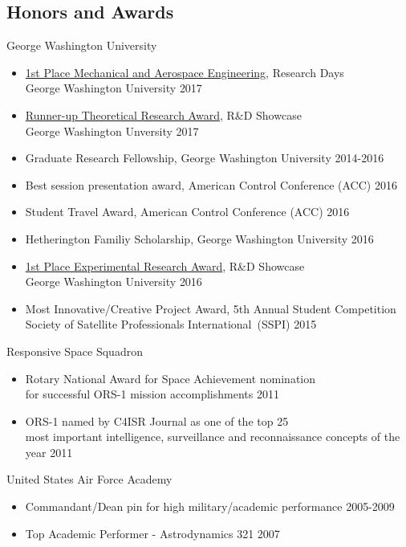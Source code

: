 \subsection*{Honors and Awards} %
{}

George Washington University
\begin{itemize}
    \item {\href{http://researchdays.gwu.edu}{1st Place Mechanical and Aerospace Engineering}, Research Days\\George Washington University} \hfill {2017} 
    \item {\href{https://www.seas.gwu.edu/RDshowcase}{Runner-up Theoretical Research Award}, R\&D Showcase\\George Washington Unversity} \hfill {2017}
    \item Graduate Research Fellowship, George Washington University \hfill {2014-2016}
    \item Best session presentation award, American Control Conference (ACC) \hfill {2016}
    \item Student Travel Award, American Control Conference (ACC) \hfill {2016}
    \item Hetherington Familiy Scholarship, George Washington University \hfill {2016}
    \item {\href{1https://www.seas.gwu.edu/student-research-development-winners-year#2016}{1st Place Experimental Research Award}, R\&D Showcase\\ George Washington University} \hfill {2016}
    \item {Most Innovative/Creative Project Award, 5th Annual Student Competition \\ 
    Society of Satellite Professionals International~(SSPI) } \hfill {2015}  
\end{itemize}

Responsive Space Squadron
\begin{itemize}
    \item Rotary National Award for Space Achievement nomination \\
    for successful ORS-1 mission accomplishments \hfill {2011} 
    \item ORS-1 named by C4ISR Journal as one of the top 25\\
     most important intelligence, surveillance and reconnaissance concepts of the year \hfill {2011}
\end{itemize}

United States Air Force Academy
\begin{itemize}
\item Commandant/Dean pin for high military/academic performance \hfill {2005-2009}
\item Top Academic Performer - Astrodynamics 321 \hfill {2007}
\end{itemize}
